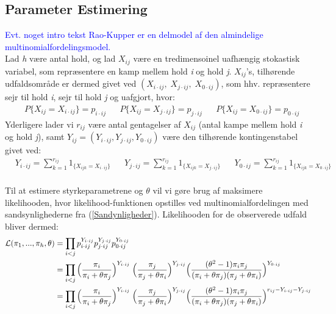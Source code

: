 \documentclass[11pt,a4paper]{article}
\begin{document}
\subsection{Parameter Estimering}
\textcolor{blue}{Evt. noget intro tekst}
\textcolor{blue}{Rao-Kupper er en delmodel af den almindelige multinomialfordelingsmodel.}\\
Lad \textit{h} være antal hold, og lad $X_{ij}$ være en tredimensoinel uafhængig stokastisk variabel, som repræsentere en kamp mellem hold \textit{i} og hold \textit{j}. $X_{ij}$'s, tilhørende udfaldsområde er dermed givet ved $(X_{i\cdot ij},\;X_{j\cdot ij},\;X_{0\cdot ij})$, som hhv. repræsentere sejr til hold \textit{i}, sejr til hold \textit{j} og uafgjort, hvor: 
\begin{align*}
   &P\{X_{ij}=X_{i\cdot ij}\}=p_{i\cdot ij} &&P\{X_{ij}=X_{j\cdot ij}\}=p_{j\cdot ij} &&P\{X_{ij}=X_{0\cdot ij}\}=p_{0\cdot ij}
\end{align*}
Yderligere lader vi $r_{ij}$ være antal gentagelser af $X_{ij}$ (antal kampe mellem hold \textit{i} og hold \textit{j}), samt $Y_{ij}=(Y_{i\cdot ij},Y_{j\cdot ij},Y_{0\cdot ij})$ være den tilhørende kontingenstabel givet ved:
\begin{align*}
    &Y_{i\cdot ij}=\sum_{k=1}^{r_{ij}}1_{\{X_{ijk}=X_{i\cdot ij}\}} &&Y_{j\cdot ij}=\sum_{k=1}^{r_{ij}}1_{\{X_{ijk}=X_{j\cdot ij}\}} &&Y_{0\cdot ij}=\sum_{k=1}^{r_{ij}}1_{\{X_{ijk}=X_{0\cdot ij}\}}
\end{align*}
\\
Til at estimere styrkeparametrene og $\theta$ vil vi gøre brug af maksimere likelihooden, hvor likelihood-funktionen opstilles ved multinomialfordelingen med sandsynlighederne fra (\ref{Sandynligheder}). Likelihooden for de observerede udfald bliver dermed:
\begin{align*}
\mathcal{L}(\pi_1,...,\pi_h,\theta) &= \prod_{i<j}p_{i\cdot ij}^{Y_{i\cdot ij}}p_{j\cdot ij}^{Y_{j\cdot ij}}p_{0\cdot ij}^{Y_{0\cdot ij}}\\
&= \prod_{i<j}\Big{(}\frac{\pi_i}{\pi_i+\theta\pi_j}\Big{)}^{Y_{i\cdot ij}}
\;\Big{(}\frac{\pi_j}{\pi_j+\theta\pi_i}\Big{)}^{Y_{j\cdot ij}}
\Big{(}\frac{(\theta^2-1)\pi_i \pi_j}{(\pi_i+\theta\pi_j)(\pi_j+\theta\pi_i)}\Big{)}^{Y_{0\cdot ij}}\\
&=\prod_{i<j}\Big{(}\frac{\pi_i}{\pi_i+\theta\pi_j}\Big{)}^{Y_{i\cdot ij}}
\;\Big{(}\frac{\pi_j}{\pi_j+\theta\pi_i}\Big{)}^{Y_{j\cdot ij}}
\Big{(}\frac{(\theta^2-1)\pi_i \pi_j}{(\pi_i+\theta\pi_j)(\pi_j+\theta\pi_i)}\Big{)}^{r_{ij}-{Y_{i\cdot ij}}-{Y_{j\cdot ij}}}\\
\end{align*}
\end{document}
